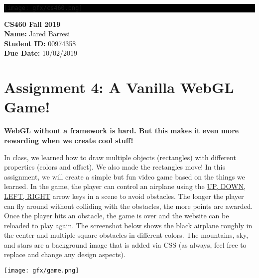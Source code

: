 \documentclass[10pt,oneside,onecolumn,letterpaper]{article}
\begin{document}
\noindent\colorbox{black}{
\begin{minipage}[c]{.99\linewidth}
  \vspace{.4cm}
  \Large{}
  \begin{flushright}
    \vspace{-1.2cm}
    \texttt{[image: gfx/cs460.png]}
  \end{flushright}
\end{minipage}
}


\vspace{.5cm} %

\noindent\textbf{CS460 Fall 2019} \\
\textbf{Name:} Jared Barresi \\
\textbf{Student ID:} 00974358 \\
\textbf{Due Date:} 10/02/2019

\section*{Assignment 4: A Vanilla WebGL Game!}

\textbf{WebGL without a framework is hard. But this makes it even more rewarding when we create cool stuff!}

\vspace{.5cm} %

In class, we learned how to draw multiple objects (rectangles) with different properties (colors and offset). We also made the rectangles move! In this assignment, we will create a simple but fun video game based on the things we learned. In the game, the player can control an airplane using the \url{UP, DOWN, LEFT, RIGHT} arrow keys in a scene to avoid obstacles. The longer the player can fly around without colliding with the obstacles, the more points are awarded. Once the player hits an obstacle, the game is over and the website can be reloaded to play again. The screenshot below shows the black airplane roughly in the center and multiple square obstacles in different colors. The mountains, sky, and stars are a background image that is added via CSS (as always, feel free to replace and change any design aspects).

\begin{center}
\texttt{[image: gfx/game.png]}
\end{center}
\end{document}
